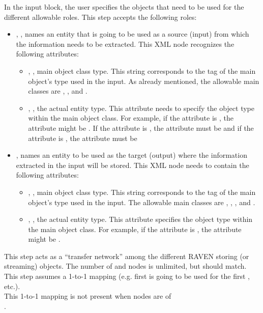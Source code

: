 \vspace{-5mm}
In the  input block, the user specifies the objects that need to
be used for the different allowable roles.
This step accepts the following roles:
\begin{itemize}
\item {}, , names an entity
  that is going to be used as a source (input) from which the information needs
  to be extracted.
  This XML node recognizes the following attributes:
\begin{itemize}
  \item {}, , main object class
    type.
    This string corresponds to the tag of the main object's type used in the
    input.
    As already mentioned, the allowable main classes are ,
    ,  and .
  \item {}, , the actual entity
    type.
    This attribute needs to specify the object type within the main object
    class.
    For example, if the   attribute is , the
     attribute might be . If the   attribute is , the
     attribute must be  and if the   attribute is , the
     attribute must be \xmlString{ }
\end{itemize}
\item {},  names an entity to 
  be used as the target (output) where the information extracted in the input
  will be stored.
  This XML node needs to contain the following attributes:
\begin{itemize}
  \item {}, , main object class
    type.
    This string corresponds to the tag of the main object's type used in the
    input.
    The allowable main classes are , , ,  and .
  \item {}, , the actual entity
    type.
    This attribute specifies the object type within the main object class.
    For example, if the  attribute is 
    , the  attribute might be
    .
\end{itemize}
\end{itemize}
This step acts as a ``transfer network'' among the different RAVEN storing
(or streaming) objects.
%
The number of  and  nodes is unlimited, but
should match.
%
This step assumes a 1-to-1 mapping (e.g. first  is going to be
used for the first , etc.).
\\
\nb This 1-to-1 mapping is not present when  nodes are of
\\.

